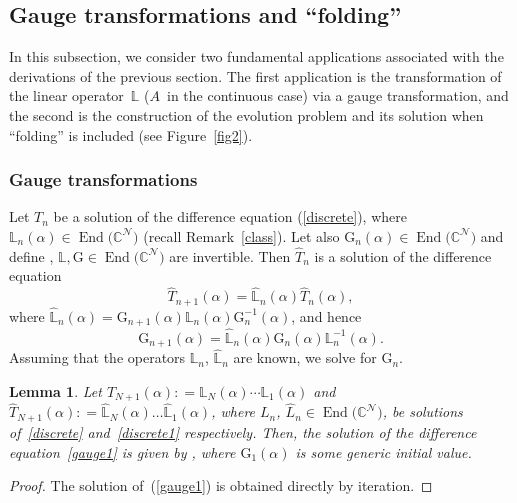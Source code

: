 \documentclass[pdftex]{sigma}
\numberwithin{equation}{section}
\newcounter{diff_order}
\newcounter{diff_power}
\newtheorem{lem}[thm]{Lemma}
\theoremstyle{definition}
\DeclareMathOperator{\EEnd}{End}%
\begin{document}
\subsection{Gauge {transformations} and ``folding''}\label{section3.2}

 In this subsection, we consider two fundamental applications
associated with the derivations of the previous section.
The first application is the transformation of the linear operator~${\mathbb L}$ ($A$~in the continuous case) via a gauge transformation,
and the second is the construction of the evolution problem and its solution when ``folding'' is included (see Figure~\ref{fig2}).

\subsubsection{Gauge transformations} Let $T_n$ be a solution of the difference equation
(\ref{discrete}), where ${\mathbb L}_n(\alpha) \in \EEnd\bigl({\mathbb C}^{\mathcal N}\bigr)$ (recall Remark~\ref{class}). Let also
${\mathrm G}_n(\alpha) \in \EEnd\bigl({\mathbb C}^{\mathcal N}\bigr)$ and define , ${\mathbb L}, {\mathrm G} \in \EEnd\bigl({\mathbb C}^{\mathcal N}\bigr)$ are invertible.
Then
$\hat T_n$ is a solution of the difference equation
\begin{equation}
\hat T_{n+1}(\alpha) = \hat {\mathbb L}_n(\alpha) \hat T_n(\alpha), \label{discrete1}
\end{equation}
 where
$\hat {\mathbb L}_n(\alpha) = {\mathrm G}_{n+1}(\alpha) {\mathbb L}_n(\alpha) {\mathrm G}_{n}^{-1}(\alpha)$,
and hence
\begin{equation}
{\mathrm G}_{n+1}(\alpha) = \hat {\mathbb L}_n(\alpha) {\mathrm G}_n(\alpha) {\mathbb L}^{-1}_n(\alpha).\label{gauge1}
\end{equation}
 Assuming that the operators ${\mathbb L_n}$, $\hat {\mathbb L}_n$ are known, we solve for ${\mathrm G}_n$.

\begin{lem}%
Let $T_{N+1} (\alpha): = {\mathbb L}_{N}(\alpha)\cdots {\mathbb L}_{1}(\alpha)$ and $\hat T_{N+1} (\alpha): = \hat {\mathbb L}_{N}(\alpha)\dots \hat {\mathbb L}_{1}(\alpha)$, where $L_n$, $\hat L_n \in\EEnd\bigl({\mathbb C}^{\mathcal N}\bigr)$, be solutions of~\eqref{discrete} and~\eqref{discrete1} respectively. Then, the solution of the difference equation~\eqref{gauge1} is given by , where ${\mathrm G}_1(\alpha)$ is some generic initial value.
\end{lem}
\begin{proof} The solution of~(\ref{gauge1}) is obtained directly by iteration.
\end{proof}
\end{document}

